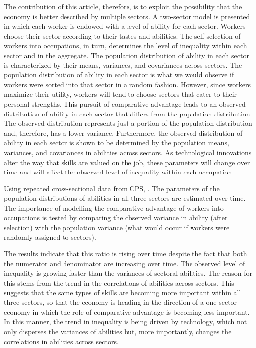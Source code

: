 \documentclass[12pt]{article}
\newcommand{\highlightP}[1]{{\emph{\color{MyPink}{#1}}}}
\newcommand{\highlightPP}[1]{{\emph{\color{MyPurple}{#1}}}}
\theoremstyle{definition}
\begin{document}
The contribution of this article, therefore, is to exploit the possibility that the economy is better described by multiple sectors. A two-sector model is presented in which each worker is endowed with a level of ability for each sector. Workers choose their sector according to their tastes and abilities. The self-selection of workers into occupations, in turn, determines the level of inequality within each sector and in the aggregate. The population distribution of ability in each sector is characterized by their means, variances, and covariances across sectors. The population distribution of ability in each sector is what we would observe if workers were sorted into that sector in a random fashion. However, since workers maximize their utility, workers will tend to choose sectors that cater to their personal strengths. This pursuit of comparative advantage leads to an observed distribution of ability in each sector that differs from the population distribution. The observed distribution represents just a portion of the population distribution and, therefore, has a lower variance. Furthermore, the observed distribution of ability in each sector is shown to be determined by the population means, variances, and covariances in abilities across sectors. As technological innovations alter the way that skills are valued on the job, these parameters will change over time and will affect the observed level of inequality within each occupation.

Using repeated cross-sectional data from CPS, \highlightPP{workers are divided into three broas occupational sectors (professional, services, and blue-color)}. The parameters of the population distributions of abilities in all three sectors are estimated over time. The importance of modelling the comparative advantage of workers into occupations is tested by comparing the observed variance in ability (after selection) with the population variance (what would occur if workers were randomly assigned to sectors). 

The results indicate that this ratio is rising over time despite the fact that both the numerator and denominator are increasing over time. The observed level of inequality is growing faster than the variances of sectoral abilities. The reason for this stems from the trend in the correlations of abilities across sectors. \highlightP{The results show an upward trend in the correlations across each of the three occupations.} This suggests that the same types of skills are becoming more important within all three sectors, so that the economy is heading in the direction of a one-sector economy in which the role of comparative advantage is becoming less important. In this manner, the trend in inequality is being driven by technology, which not only disperses the variances of abilities but, more importantly, changes the correlations in abilities across sectors. 
\end{document}

